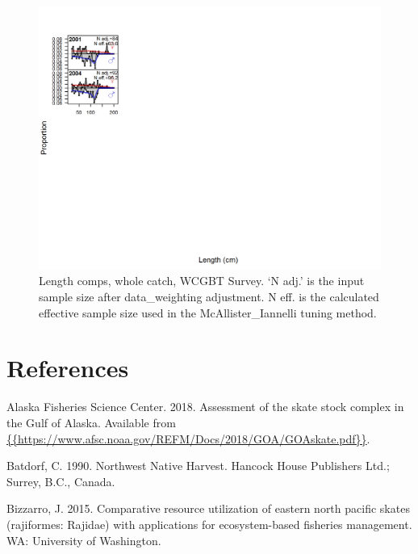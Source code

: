 \documentclass[12pt,]{article}
\begin{document}
\begin{figure}
\centering
\includegraphics{./r4ss/plots_mod1/comp_lenfit_flt6mkt0.png}
\caption{Length comps, whole catch, WCGBT Survey. `N adj.' is the input
sample size after data\_weighting adjustment. N eff. is the calculated
effective sample size used in the McAllister\_Iannelli tuning method.
\label{fig:mod1_4_comp_lenfit_flt6mkt0}}
\end{figure}

\newpage

\color{black}

\hypertarget{references}{%
\section*{References}\label{references}}

\renewcommand{\thepage}{}

\hypertarget{refs}{}
\leavevmode\hypertarget{ref-AFSC2018}{}%
Alaska Fisheries Science Center. 2018. Assessment of the skate stock
complex in the Gulf of Alaska. Available from
\href{\%7B\%7Bhttps://www.afsc.noaa.gov/REFM/Docs/2018/GOA/GOAskate.pdf\%7D\%7D}{\{\{https://www.afsc.noaa.gov/REFM/Docs/2018/GOA/GOAskate.pdf\}\}}.

\leavevmode\hypertarget{ref-Batdorf1990}{}%
Batdorf, C. 1990. Northwest Native Harvest. Hancock House Publishers
Ltd.; Surrey, B.C., Canada.

\leavevmode\hypertarget{ref-Bizzarro2015}{}%
Bizzarro, J. 2015. Comparative resource utilization of eastern north
pacific skates (rajiformes: Rajidae) with applications for
ecosystem-based fisheries management. WA: University of Washington.
\end{document}
